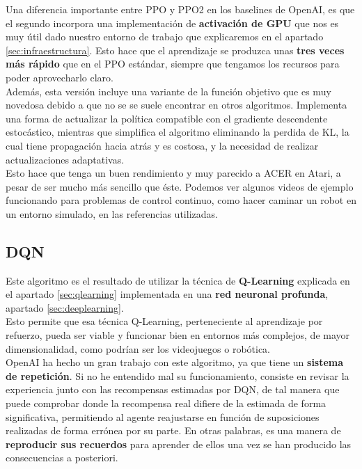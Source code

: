 \documentclass[11pt,fleqn]{book} %
\begin{document}
Una diferencia importante entre PPO y PPO2 en los baselines de OpenAI, es que el segundo incorpora una implementación de \textbf{activación de GPU} que nos es muy útil dado nuestro entorno de trabajo que explicaremos en el apartado \ref{sec:infraestructura}. Esto hace que el aprendizaje se produzca unas \textbf{tres veces más rápido} que en el PPO estándar, siempre que tengamos los recursos para poder aprovecharlo claro. \\

Además, esta versión incluye una variante de la función objetivo que es muy novedosa debido a que no se se suele encontrar en otros algoritmos. Implementa una forma de actualizar la política compatible con el gradiente descendente estocástico, mientras que simplifica el algoritmo eliminando la perdida de KL, la cual tiene propagación hacia atrás y es costosa, y la necesidad de realizar actualizaciones adaptativas. \\

Esto hace que tenga un buen rendimiento y muy parecido a ACER en Atari, a pesar de ser mucho más sencillo que éste. Podemos ver algunos videos de ejemplo funcionando para problemas de control continuo, como hacer caminar un robot en un entorno simulado, en las referencias utilizadas. \cite{article:PPO2_1} \cite{article:PPO2}

\subsection{DQN}\label{sec:DQN}

Este algoritmo es el resultado de utilizar la técnica de \textbf{Q-Learning} explicada en el apartado \ref{sec:qlearning} implementada en una \textbf{red neuronal profunda}, apartado \ref{sec:deeplearning}.  \\

Esto permite que esa técnica Q-Learning, perteneciente al aprendizaje por refuerzo, pueda ser viable y funcionar bien en entornos más complejos, de mayor dimensionalidad, como podrían ser los videojuegos o robótica. \\

OpenAI ha hecho un gran trabajo con este algoritmo, ya que tiene un \textbf{sistema de repetición}. Si no he entendido mal su funcionamiento, consiste en revisar la experiencia junto con las recompensas estimadas por DQN, de tal manera que puede comprobar donde la recompensa real difiere de la estimada de forma significativa, permitiendo al agente reajustarse en función de suposiciones realizadas de forma errónea por su parte. En otras palabras, es una manera de \textbf{reproducir sus recuerdos} para aprender de ellos una vez se han producido las consecuencias a posteriori. \\
\end{document}
